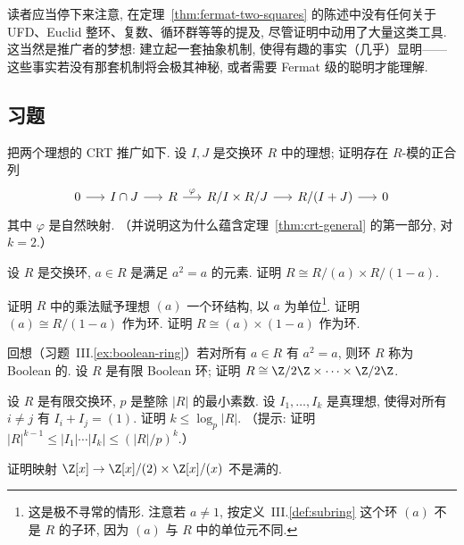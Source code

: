 读者应当停下来注意, 在定理~\ref{thm:fermat-two-squares} 的陈述中没有任何关于 UFD、Euclid 整环、复数、循环群等等的提及, 尽管证明中动用了大量这类工具. 这当然是推广者的梦想: 建立起一套抽象机制, 使得有趣的事实（几乎）显明——这些事实若没有那套机制将会极其神秘, 或者需要 Fermat 级的聪明才能理解.

\subsection*{习题}
{}

\begin{prob}
\label{ex:crt-two-ideals-exact}
把两个理想的 CRT 推广如下. 设 $I,J$ 是交换环 $R$ 中的理想; 证明存在 $R$-模的正合列
\[
\begin{tikzcd}[column sep=1.5em]
0 \ar[r] & I\cap J \ar[r] & R \ar[r,"\varphi"] & R/I\times R/J \ar[r] & R/(I+J) \ar[r] & 0
\end{tikzcd}
\]
其中 $\varphi$ 是自然映射. （并说明这为什么蕴含定理~\ref{thm:crt-general} 的第一部分, 对 $k=2$.）
\end{prob}

\begin{prob}
\label{ex:idempotent-product}
设 $R$ 是交换环, $a\in R$ 是满足 $a^2=a$ 的元素. 证明 $R\cong R/(a)\times R/(1-a)$.

证明 $R$ 中的乘法赋予理想 $(a)$ 一个环结构, 以 $a$ 为单位\footnote{这是极不寻常的情形. 注意若 $a\neq 1$, 按定义~III.\ref{def:subring} 这个环 $(a)$ 不是 $R$ 的子环, 因为 $(a)$ 与 $R$ 中的单位元不同.}. 证明 $(a)\cong R/(1-a)$ 作为环. 证明 $R\cong (a)\times(1-a)$ 作为环.
\end{prob}

\begin{prob}
\label{ex:finite-boolean-product}
回想（习题~III.\ref{ex:boolean-ring}）若对所有 $a\in R$ 有 $a^2=a$, 则环 $R$ 称为 Boolean 的. 设 $R$ 是有限 Boolean 环; 证明 $R\cong \Z/2\Z\times\cdots\times\Z/2\Z$.
\end{prob}

\begin{prob}
\label{ex:finite-ring-crt-bound}
设 $R$ 是有限交换环, $p$ 是整除 $|R|$ 的最小素数. 设 $I_1,\ldots,I_k$ 是真理想, 使得对所有 $i\neq j$ 有 $I_i+I_j=(1)$. 证明 $k\leq\log_p|R|$. （提示: 证明 $|R|^{k-1}\leq|I_1|\cdots|I_k|\leq(|R|/p)^k$.）
\end{prob}

\begin{prob}
\label{ex:zxx-map-not-surj}
证明映射 $\Z[x]\to\Z[x]/(2)\times\Z[x]/(x)$ 不是满的.
\end{prob}

